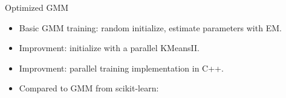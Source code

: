\begin{frame}{Optimized GMM}
  \begin{itemize}
    \item Basic GMM training: random initialize, estimate parameters with EM.
    \item Improvment: initialize with a parallel KMeansII.
    \item Improvment: parallel training implementation in C++.
    \item Compared to GMM from scikit-learn:
  \end{itemize}

  \begin{columns}
    \begin{column}{0.5\textwidth}
      \begin{center}
      \end{center}
      \vspace{0.6em}
    \end{column}
    \begin{column}{0.6\textwidth}
    \end{column}
  \end{columns}
  \vspace{3em}


\end{frame}
